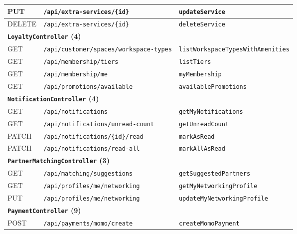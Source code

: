 {\begin{longtable}{|p{1.5cm}|p{7.3cm}|p{5.0cm}|}
\hline
PUT & \texttt{/\allowbreak api/\allowbreak extra-services/\allowbreak \{id\}} & \texttt{updateService} \\
\hline
DELETE & \texttt{/\allowbreak api/\allowbreak extra-services/\allowbreak \{id\}} & \texttt{deleteService} \\
\hline
\multicolumn{3}{|l|}{\textbf{\texttt{LoyaltyController} (4)}} \\
\hline
GET & \texttt{/\allowbreak api/\allowbreak customer/\allowbreak spaces/\allowbreak workspace-types} & \texttt{listWorkspaceTypesWithAmenities} \\
\hline
GET & \texttt{/\allowbreak api/\allowbreak membership/\allowbreak tiers} & \texttt{listTiers} \\
\hline
GET & \texttt{/\allowbreak api/\allowbreak membership/\allowbreak me} & \texttt{myMembership} \\
\hline
GET & \texttt{/\allowbreak api/\allowbreak promotions/\allowbreak available} & \texttt{availablePromotions} \\
\hline
\multicolumn{3}{|l|}{\textbf{\texttt{NotificationController} (4)}} \\
\hline
GET & \texttt{/\allowbreak api/\allowbreak notifications} & \texttt{getMyNotifications} \\
\hline
GET & \texttt{/\allowbreak api/\allowbreak notifications/\allowbreak unread-count} & \texttt{getUnreadCount} \\
\hline
PATCH & \texttt{/\allowbreak api/\allowbreak notifications/\allowbreak \{id\}/\allowbreak read} & \texttt{markAsRead} \\
\hline
PATCH & \texttt{/\allowbreak api/\allowbreak notifications/\allowbreak read-all} & \texttt{markAllAsRead} \\
\hline
\multicolumn{3}{|l|}{\textbf{\texttt{PartnerMatchingController} (3)}} \\
\hline
GET & \texttt{/\allowbreak api/\allowbreak matching/\allowbreak suggestions} & \texttt{getSuggestedPartners} \\
\hline
GET & \texttt{/\allowbreak api/\allowbreak profiles/\allowbreak me/\allowbreak networking} & \texttt{getMyNetworkingProfile} \\
\hline
PUT & \texttt{/\allowbreak api/\allowbreak profiles/\allowbreak me/\allowbreak networking} & \texttt{updateMyNetworkingProfile} \\
\hline
\multicolumn{3}{|l|}{\textbf{\texttt{PaymentController} (9)}} \\
\hline
POST & \texttt{/\allowbreak api/\allowbreak payments/\allowbreak momo/\allowbreak create} & \texttt{createMomoPayment} \\

\end{longtable}}

